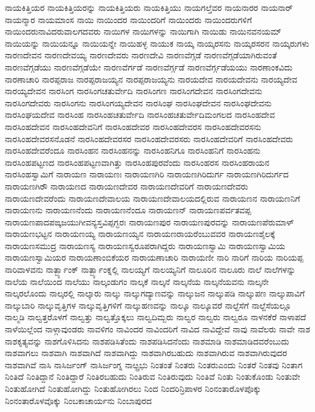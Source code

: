 {ನಾಯಕಿತ್ತಿಯರ
ನಾಯಕಿತ್ತಿಯರನ್ನು
ನಾಯಕಿತ್ತಿಯರು
ನಾಯಕಿತ್ತಿಯು
ನಾಯಗಲ್ತೆವರ
ನಾಯನಾರರ
ನಾಯನಾರ್
ನಾಯನ್ಮಾರ
ನಾಯಮಾಂಸ
ನಾಯಿ
ನಾಯಿಂದರ
ನಾಯಿಂದರಿಗೆ
ನಾಯಿಂದರು
ನಾಯಿಂದರುಗಳಿಗೆ
ನಾಯಿಂದರುನಾವಿದರುವಾಲಗದವರು
ನಾಯಿಗಳ
ನಾಯಿಗಳನ್ನು
ನಾಯಿಗಾಗಿ
ನಾಯಿಡು
ನಾಯಿನವನಯಮ್
ನಾಯಿಯನ್ನು
ನಾಯಿಯನ್ನೂ
ನಾಯಿಯನ್ನೇ
ನಾಯಿಹಳ್ಳ
ನಾಯುಕ
ನಾಯ್ಕ
ನಾಯ್ಕರಸನು
ನಾಯ್ಕರಸರನ
ನಾಯ್ಕರುಗಳು
ನಾರಣದೇವನ
ನಾರಣದೇವಯ್ಯ
ನಾರಣದೇವರು
ನಾರಣದೇವಿ
ನಾರಣವೆಗ್ಗಡೆ
ನಾರಣವೆಗ್ಗಡೆಯಾಗಿರುವಂತೆ
ನಾರಣವೆಗ್ಗಡೆಯು
ನಾರಣವೆಗ್ಗಡೆಯೇ
ನಾರಣವೆರ್ಗಡೆ
ನಾರಣವೆರ್ಗ್ಗಡೆ
ನಾರಣವೆರ್ಗ್ಗಡೆಯಯು
ನಾರಣಾಂಕವಿದು
ನಾರಣಾಚಾರಿ
ನಾರಪ್ಪರಾಜ
ನಾರಪ್ಪರಾಜಯ್ಯನ
ನಾರಪ್ಪರಾಜಯ್ಯನು
ನಾರಯದೇವ
ನಾರಯದೇವನು
ನಾರಯ್ಯದೇವ
ನಾರಯ್ಯದೇವನ
ನಾರಸಿಂಗ
ನಾರಸಿಂಗಚತುರ್ವೇದಿ
ನಾರಸಿಂಗಣ
ನಾರಸಿಂಗದೇವನ
ನಾರಸಿಂಗದೇವನು
ನಾರಸಿಂಗದೇವರು
ನಾರಸಿಂಗನು
ನಾರಸಿಂಗಯ್ಯದೇವನ
ನಾರಸಿಂಘ
ನಾರಸಿಂಘದೇವನ
ನಾರಸಿಂಘದೇವನು
ನಾರಸಿಂಘಯದೇವ
ನಾರಸಿಂಹ
ನಾರಸಿಂಹಚತುರ್ವೇದಿ
ನಾರಸಿಂಹಚತುರ್ವೇದಿಮಂಗಲದ
ನಾರಸಿಂಹದೇವ
ನಾರಸಿಂಹದೇವನ
ನಾರಸಿಂಹದೇವನಿಗೆ
ನಾರಸಿಂಹದೇವರ
ನಾರಸಿಂಹದೇವರಸ
ನಾರಸಿಂಹದೇವರಸನು
ನಾರಸಿಂಹದೇವರಸನೊಡನೆ
ನಾರಸಿಂಹದೇವರಸರ
ನಾರಸಿಂಹದೇವರಸರು
ನಾರಸಿಂಹದೇವರಿಗೆ
ನಾರಸಿಂಹದೇವರು
ನಾರಸಿಂಹದೇವರೆಂದೂ
ನಾರಸಿಂಹನ
ನಾರಸಿಂಹನನ್ನು
ನಾರಸಿಂಹನಿಗೂ
ನಾರಸಿಂಹನಿಗೆ
ನಾರಸಿಂಹನು
ನಾರಸಿಂಹಪಟ್ಟಣದ
ನಾರಸಿಂಹಪಟ್ಟಣವಾಗಿತ್ತು
ನಾರಸಿಂಹಪುರವೆಂದು
ನಾರಸಿಂಹರಸ
ನಾರಸಿಂಹರಾಯನ
ನಾರಸಿಂಹಸ್ವಾಮಿಗೆ
ನಾರಾಯಣ
ನಾರಾಯಣಃ
ನಾರಾಯಣಗಿರಿ
ನಾರಾಯಣಗಿರಿದುರ್ಗ
ನಾರಾಯಣಗಿರಿದುರ್ಗದ
ನಾರಾಯಣಗಿರೌ
ನಾರಾಯಣದ
ನಾರಾಯಣದೇವರ
ನಾರಾಯಣದೇವರಿಗೆ
ನಾರಾಯಣದೇವರು
ನಾರಾಯಣದೇವರೆಂದು
ನಾರಾಯಣದೇವಾಲಯ
ನಾರಾಯಣದೇವಾಲಯದಲ್ಲಿರುವ
ನಾರಾಯಣನ
ನಾರಾಯಣನಿಗೆ
ನಾರಾಯಣನು
ನಾರಾಯಣನೆಂದು
ನಾರಾಯಣನೆಂದೂ
ನಾರಾಯಣನ್
ನಾರಾಯಣಪರ್ವತವಪ್ಪ
ನಾರಾಯಣಪಾದಪಙ್ಕಜಯುಗೀವನ್ಯಸ್ತವಿಪ್ಪಗ್ಭರಃ
ನಾರಾಯಣಪುರ
ನಾರಾಯಣಪುರವನ್ನು
ನಾರಾಯಣಪೆರುಮಾಳ್
ನಾರಾಯಣಭಟ್ಟನ
ನಾರಾಯಣಯ್ಯ
ನಾರಾಯಣಯ್ಯನ
ನಾರಾಯಣರಾಯರೆಂಬುವವರ
ನಾರಾಯಣಶೈಲಕ್ಕೆ
ನಾರಾಯಣಸಮುದ್ರ
ನಾರಾಯಣಸ್ಯ
ನಾರಾಯಣಸ್ವರೂಪರಾಗಿದ್ದರು
ನಾರಾಯಣಸ್ವಾಮಿ
ನಾರಾಯಣಸ್ವಾಮಿಯ
ನಾರಾಯಣಸ್ವಾಮಿಯರ
ನಾರಾಯಣಾಂಬಿಕೆಯರ
ನಾರಾಯಣಾಚಾರಿ
ನಾರಾಯಣೀ
ನಾರಿ
ನಾರಿಗೆ
ನಾರಿಯ
ನಾರಿಯಪ್ಪ
ನಾರಿವಾಳವನು
ನಾರ್ತ್ಬ್ಯಾಂಕ್
ನಾರ್ತ್ಬ್ಯಾಂಕ್ನಲ್ಲಿ
ನಾಲಯ್ಯಗೆ
ನಾಲಯ್ಯನಿಗೆ
ನಾಲೂರಿನ
ನಾಲೂರು
ನಾಲೆ
ನಾಲೆಗಳನ್ನು
ನಾಲೆಯ
ನಾಲೆಯಿಂದ
ನಾಲೆಯು
ನಾಲ್ಕಂಡುಗಂ
ನಾಲ್ಕಕೆ
ನಾಲ್ಕನೆ
ನಾಲ್ಕನೆಯ
ನಾಲ್ಕನೆಯವನು
ನಾಲ್ಕನೇ
ನಾಲ್ಕರಲೊಂದು
ನಾಲ್ಕರಲ್ಲಿ
ನಾಲ್ಕಾರು
ನಾಲ್ಕು
ನಾಲ್ಕುಗದ್ಯಾಣವನ್ನು
ನಾಲ್ಕುಜನ
ನಾಲ್ಕುಪಡಿ
ನಾಲ್ಕುಪಣ
ನಾಲ್ಕುಪಾವಿಗೆ
ನಾಲ್ಕುಬಾರಿ
ನಾಲ್ಕುವೃತ್ತಿಗಳ
ನಾಲ್ಕುವೃತ್ತಿಗಳಿಗೆ
ನಾಲ್ಕುಹಣವನ್ನು
ನಾಲ್ಕೂ
ನಾಲ್ಕೂವರೆ
ನಾಲ್ದೆಸೆಗೆ
ನಾಲ್ದೆಸೆಯಲ್ಲೂ
ನಾಲ್ಮಡಿ
ನಾಲ್ವತ್ತರೊಳಗೆ
ನಾಲ್ವತ್ತು
ನಾಲ್ವತ್ತೊಕ್ಕಲು
ನಾಲ್ವದಿಮ್ಬರು
ನಾಲ್ವರ
ನಾಲ್ವರು
ನಾಲ್ವರೂ
ನಾಳನಕೆರೆ
ನಾಳಾಪದೆ
ನಾಳೆಯಿಲ್ಲೆಂದ
ನಾಳ್ಗಾವುಂಡರು
ನಾವಳಿಗಂ
ನಾವಿಂದರ
ನಾವಿಂದರಿಗೆ
ನಾವಿದ
ನಾವಿದ್ದೇವೆ
ನಾವು
ನಾವೆಲರು
ನಾವೇ
ನಾಶ
ನಾಶಕೃತ್ಯವನ್ನು
ನಾಶಗೊಳಿಸಿದನು
ನಾಶಪಡಿಸಿತೆಂದು
ನಾಶಪಡಿಸಿದನೆಂದು
ನಾಶಮಾಡಿ
ನಾಶಮಾಡಿದವರೆಂಬುದು
ನಾಶವಾಗಲು
ನಾಶವಾಗಿ
ನಾಶವಾಗಿದೆ
ನಾಶವಾಗಿದ್ದು
ನಾಶವಾಗಿರಬಹುದು
ನಾಶವಾಗಿರುವ
ನಾಶವಾಗಿರುವುದರ
ನಾಶವಾಗಿವೆ
ನಾಸಿ
ನಾಸಿರ್ಜಂಗ್
ನಾಸಿರ್ಜಂಗ್ನ
ನಾೞ್ಪ್ರಭು
ನಿಂತಂತೆ
ನಿಂತರು
ನಿಂತರುಎಂದು
ನಿಂತರೆ
ನಿಂತವು
ನಿಂತಾಗ
ನಿಂತಿದೆ
ನಿಂತಿದ್ದಾನೆ
ನಿಂತಿದ್ದಾರೆ
ನಿಂತಿರಬಹುದು
ನಿಂತಿರುವ
ನಿಂತಿರುವುದು
ನಿಂತಿವೆ
ನಿಂತು
ನಿಂತುಕೊಂಡು
ನಿಂತುವೇ
ನಿಂತುಹೋಗಿದೆ
ನಿಂತುಹೋಗಿದ್ದು
ನಿಂತುಹೋಗಿರಲು
ನಿಂದ
ನಿಂದರಿನ್ರಿಪಾಳರ
ನಿಂನಂತಾರೊಳಪೊಕ್ಕು
ನಿಂನಂತಾರೊಳವೊಕ್ಕು
ನಿಂಬಕಾಚಾರ್ಯನು
ನಿಂಬಾಪುರದ
}
